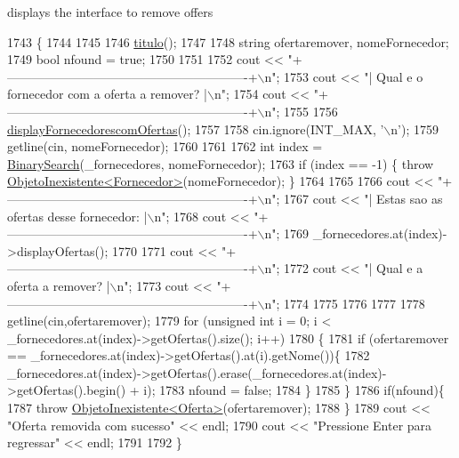 displays the interface to remove offers 


\begin{DoxyCode}
1743                            \{
1744 
1745 
1746     \hyperlink{classEmpresa_ad79f7196a8ce7256771cbd7b9542155c}{titulo}();
1747 
1748     \textcolor{keywordtype}{string} ofertaremover, nomeFornecedor;
1749     \textcolor{keywordtype}{bool} nfound = \textcolor{keyword}{true};
1750 
1751 
1752     cout << \textcolor{stringliteral}{"+----------------------------------------------------------+\(\backslash\)n"};
1753     cout << \textcolor{stringliteral}{"| Qual e o fornecedor com a oferta a remover?              |\(\backslash\)n"};
1754     cout << \textcolor{stringliteral}{"+----------------------------------------------------------+\(\backslash\)n"};
1755 
1756     \hyperlink{classEmpresa_aa47e9a64800a41180b7f374b73a1f32b}{displayFornecedorescomOfertas}();
1757 
1758     cin.ignore(INT\_MAX, \textcolor{charliteral}{'\(\backslash\)n'});
1759     getline(cin, nomeFornecedor);
1760 
1761 
1762     \textcolor{keywordtype}{int} index = \hyperlink{extras_8h_abc85c93edf561168b5bbee8054caa388}{BinarySearch}(\_fornecedores, nomeFornecedor);
1763     \textcolor{keywordflow}{if} (index == -1) \{ \textcolor{keywordflow}{throw} \hyperlink{classObjetoInexistente}{ObjetoInexistente<Fornecedor>}(nomeFornecedor); \}
1764 
1765 
1766     cout << \textcolor{stringliteral}{"+----------------------------------------------------------+\(\backslash\)n"};
1767     cout << \textcolor{stringliteral}{"| Estas sao as ofertas desse fornecedor:                   |\(\backslash\)n"};
1768     cout << \textcolor{stringliteral}{"+----------------------------------------------------------+\(\backslash\)n"};
1769     \_fornecedores.at(index)->displayOfertas();
1770 
1771     cout << \textcolor{stringliteral}{"+----------------------------------------------------------+\(\backslash\)n"};
1772     cout << \textcolor{stringliteral}{"| Qual e a oferta a remover?                               |\(\backslash\)n"};
1773     cout << \textcolor{stringliteral}{"+----------------------------------------------------------+\(\backslash\)n"};
1774 
1775 
1776     
1777 
1778     getline(cin,ofertaremover);
1779     \textcolor{keywordflow}{for} (\textcolor{keywordtype}{unsigned} \textcolor{keywordtype}{int} i = 0; i < \_fornecedores.at(index)->getOfertas().size(); i++)
1780     \{
1781         \textcolor{keywordflow}{if} (ofertaremover == \_fornecedores.at(index)->getOfertas().at(i).getNome())\{
1782             \_fornecedores.at(index)->getOfertas().erase(\_fornecedores.at(index)->getOfertas().begin() + i);
1783             nfound = \textcolor{keyword}{false}; 
1784         \}
1785     \}
1786     \textcolor{keywordflow}{if}(nfound)\{
1787         \textcolor{keywordflow}{throw} \hyperlink{classObjetoInexistente}{ObjetoInexistente<Oferta>}(ofertaremover);
1788     \}
1789     cout << \textcolor{stringliteral}{"Oferta removida com sucesso"} << endl;
1790     cout << \textcolor{stringliteral}{"Pressione Enter para regressar"} << endl;
1791 
1792 \}
\end{DoxyCode}


